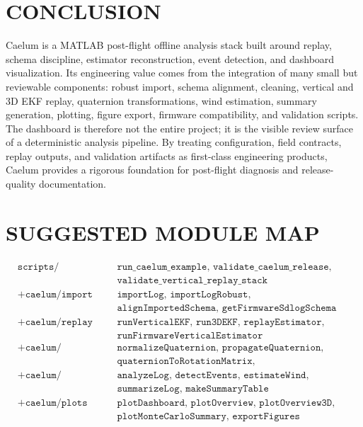 \documentclass[colorlinks,upint,subscriptcorrection,varvw,hyphenate,balance]{asmeconf}
\begin{document}
\section{CONCLUSION}

Caelum is a MATLAB post-flight offline analysis stack built around replay, schema discipline, estimator reconstruction, event detection, and dashboard visualization. Its engineering value comes from the integration of many small but reviewable components: robust import, schema alignment, cleaning, vertical and 3D EKF replay, quaternion transformations, wind estimation, summary generation, plotting, figure export, firmware compatibility, and validation scripts. The dashboard is therefore not the entire project; it is the visible review surface of a deterministic analysis pipeline. By treating configuration, field contracts, replay outputs, and validation artifacts as first-class engineering products, Caelum provides a rigorous foundation for post-flight diagnosis and release-quality documentation.

\appendix

\section{SUGGESTED MODULE MAP}

\begin{equation*}
\begin{aligned}
&\texttt{scripts/} && \texttt{run\_caelum\_example, validate\_caelum\_release,}\\
& && \texttt{validate\_vertical\_replay\_stack}\\[2pt]
&\texttt{+caelum/import} && \texttt{importLog, importLogRobust,}\\
& && \texttt{alignImportedSchema, getFirmwareSdlogSchema}\\[2pt]
&\texttt{+caelum/replay} && \texttt{runVerticalEKF, run3DEKF, replayEstimator,}\\
& && \texttt{runFirmwareVerticalEstimator}\\[2pt]
&\texttt{+caelum/attitude} && \texttt{normalizeQuaternion, propagateQuaternion,}\\
& && \texttt{quaternionToRotationMatrix, quaternionToEulerZYX}\\[2pt]
&\texttt{+caelum/analysis} && \texttt{analyzeLog, detectEvents, estimateWind,}\\
& && \texttt{summarizeLog, makeSummaryTable}\\[2pt]
&\texttt{+caelum/plots} && \texttt{plotDashboard, plotOverview, plotOverview3D,}\\
& && \texttt{plotMonteCarloSummary, exportFigures}
\end{aligned}
\end{equation*}
\end{document}
